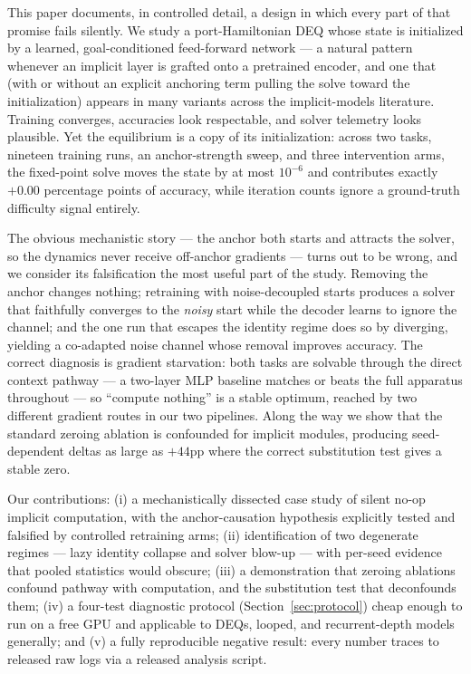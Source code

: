 \documentclass[11pt]{article}
\begin{document}
This paper documents, in controlled detail, a design in which every
part of that promise fails silently. We study a port-Hamiltonian DEQ
whose state is initialized by a learned, goal-conditioned feed-forward
network --- a natural pattern whenever an implicit layer is grafted onto
a pretrained encoder, and one that (with or without an explicit
anchoring term pulling the solve toward the initialization) appears in
many variants across the implicit-models literature. Training
converges, accuracies look respectable, and solver telemetry looks
plausible. Yet the equilibrium is a copy of its initialization: across
two tasks, nineteen training runs, an anchor-strength sweep, and three
intervention arms, the fixed-point solve moves the state by at most
$10^{-6}$ and contributes exactly $+0.00$ percentage points of
accuracy, while iteration counts ignore a ground-truth difficulty
signal entirely.

The obvious mechanistic story --- the anchor both starts and attracts
the solver, so the dynamics never receive off-anchor gradients --- turns
out to be wrong, and we consider its falsification the most useful
part of the study. Removing the anchor changes nothing; retraining
with noise-decoupled starts produces a solver that faithfully
converges to the \emph{noisy} start while the decoder learns to ignore
the channel; and the one run that escapes the identity regime does so
by diverging, yielding a co-adapted noise channel whose removal
improves accuracy. The correct diagnosis is gradient starvation: both
tasks are solvable through the direct context pathway --- a two-layer
MLP baseline matches or beats the full apparatus throughout --- so
``compute nothing'' is a stable optimum, reached by two different
gradient routes in our two pipelines. Along the way we show that the
standard zeroing ablation is confounded for implicit modules,
producing seed-dependent deltas as large as $+44$pp where the correct
substitution test gives a stable zero.

Our contributions: (i) a mechanistically dissected case study of
silent no-op implicit computation, with the anchor-causation
hypothesis explicitly tested and falsified by controlled retraining
arms; (ii) identification of two degenerate regimes --- lazy identity
collapse and solver blow-up --- with per-seed evidence that pooled
statistics would obscure; (iii) a demonstration that zeroing ablations
confound pathway with computation, and the substitution test that
deconfounds them; (iv) a four-test diagnostic protocol
(Section~\ref{sec:protocol}) cheap enough to run on a free GPU and
applicable to DEQs, looped, and recurrent-depth models generally; and
(v) a fully reproducible negative result: every number traces to
released raw logs via a released analysis script.
\end{document}
